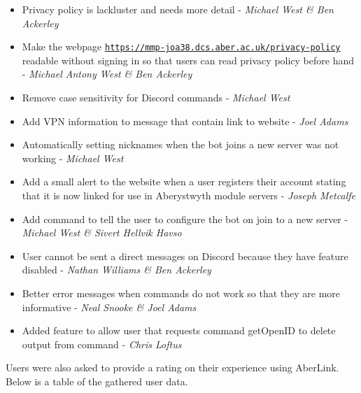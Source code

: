 \begin{itemize}
    \item Privacy policy is lackluster and needs more detail - \textit{Michael West \& Ben Ackerley}
    \item Make the webpage \href{https://mmp-joa38.dcs.aber.ac.uk/privacy-policy}{\nolinkurl{https://mmp-joa38.dcs.aber.ac.uk/privacy-policy}} readable without signing in so that users can read privacy policy before hand - \textit{Michael Antony West \& Ben Ackerley}
    \item Remove case sensitivity for Discord commands - \textit{Michael West}
    \item Add VPN information to message that contain link to website - \textit{Joel Adams}
    \item Automatically setting nicknames when the bot joins a new server was not working - \textit{Michael West}
    \item Add a small alert to the website when a user registers their account stating that it is now linked for use in Aberystwyth module servers - \textit{Joseph Metcalfe}
    \item Add command to tell the user to configure the bot on join to a new server - \textit{Michael West \& Sivert Hellvik Havso}
    \item User cannot be sent a direct messages on Discord because they have feature disabled - \textit{Nathan Williams \& Ben Ackerley}
    \item Better error messages when commands do not work so that they are more informative - \textit{Neal Snooke \& Joel Adams}
    \item Added feature to allow user that requests command getOpenID to delete output from command - \textit{Chris Loftus}
\end{itemize}

Users were also asked to provide a rating on their experience using AberLink. Below is a table of the gathered user data.

